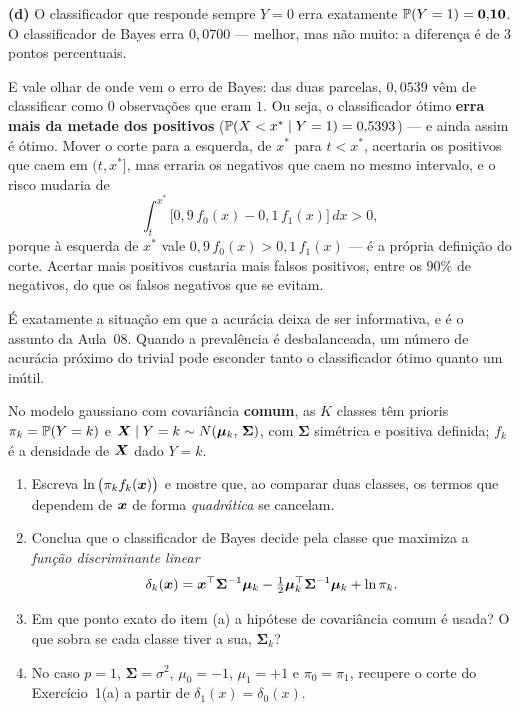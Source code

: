 \documentclass[11pt,a4paper]{article}
\begin{document}
\begin{solucao}
\smallskip
\textbf{(d)} O classificador que responde sempre $Y=0$ erra exatamente
$\mathbb{P}(Y=1)=\mathbf{0{,}10}$. O classificador de Bayes erra $0{,}0700$ --- melhor,
mas não muito: a diferença é de 3 pontos percentuais.

E vale olhar de onde vem o erro de Bayes: das duas parcelas, $0{,}0539$ vêm de
classificar como $0$ observações que eram $1$. Ou seja, o classificador ótimo
\textbf{erra mais da metade dos positivos} ($\mathbb{P}(X<x^\ast\mid Y=1)=0{,}5393$) ---
e ainda assim é ótimo. Mover o corte para a esquerda, de $x^\ast$ para $t<x^\ast$,
acertaria os positivos que caem em $(t,x^\ast]$, mas erraria os negativos que caem
no mesmo intervalo, e o risco mudaria de
\[
  \int_t^{x^\ast}\big[0{,}9\,f_0(x)-0{,}1\,f_1(x)\big]\,dx > 0,
\]
porque à esquerda de $x^\ast$ vale $0{,}9\,f_0(x)>0{,}1\,f_1(x)$ --- é a própria
definição do corte. Acertar mais positivos custaria mais falsos positivos, entre os
$90\%$ de negativos, do que os falsos negativos que se evitam.

É exatamente a situação em que a acurácia deixa de ser informativa, e é o assunto
da Aula~08. Quando a prevalência é desbalanceada, um número de acurácia próximo
do trivial pode esconder tanto o classificador ótimo quanto um inútil.
\end{solucao}

\begin{exercicio}
No modelo gaussiano com covariância \textbf{comum}, as $K$ classes têm prioris
$\pi_k=\mathbb{P}(Y=k)$ e $\bm{X}\mid Y=k \sim N(\bm\mu_k,\,\bm\Sigma)$, com $\bm\Sigma$
simétrica e positiva definida; $f_k$ é a densidade de $\bm{X}$ dado $Y=k$.
\begin{enumerate}[label=(\alph*),leftmargin=1.1cm]
  \item Escreva $\ln\big(\pi_k f_k(\bm{x})\big)$ e mostre que, ao comparar duas
        classes, os termos que dependem de $\bm{x}$ de forma \emph{quadrática}
        se cancelam.
  \item Conclua que o classificador de Bayes decide pela classe que maximiza a
        \emph{função discriminante linear}
        \[
          \delta_k(\bm{x}) = \bm{x}^\top\bm\Sigma^{-1}\bm\mu_k
            - \tfrac12\bm\mu_k^\top\bm\Sigma^{-1}\bm\mu_k + \ln\pi_k .
        \]
  \item Em que ponto exato do item (a) a hipótese de covariância comum é usada?
        O que sobra se cada classe tiver a sua, $\bm\Sigma_k$?
  \item No caso $p=1$, $\bm\Sigma=\sigma^2$, $\mu_0=-1$, $\mu_1=+1$ e
        $\pi_0=\pi_1$, recupere o corte do Exercício~1(a) a partir de
        $\delta_1(x)=\delta_0(x)$.
\end{enumerate}
\end{exercicio}
\end{document}
